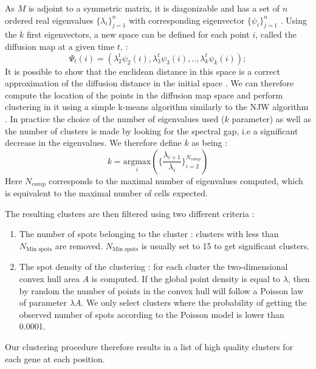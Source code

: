 \documentclass[12pt]{article}
\begin{document}
 

As $M$ is adjoint to a symmetric matrix, it is diagonizable and has a set of $n$ ordered real eigenvalues $\{\lambda_{i}\}_{j=1}^{n}$ with corresponding eigenvector $\{\psi_{i}\}_{j=1}^{n}$ . Using the $k$ first eigenvectors, a new  space can be defined for each point $i$, called the diffusion map at a given time $t$,  :
\begin{equation}
\Psi_{t}(i) = (\lambda_{2}^{t}\psi_{2}(i),\lambda_{3}^{t}\psi_{3}(i),..,\lambda_{k}^{t}\psi_{k}(i));
\end{equation}
It is possible to show that the euclidean distance in this space is a correct approximation of the diffusion distance in the initial space \citep{nadler_diffusion_2005}. We can therefore compute the location of the points in the diffusion map space and perform clustering in it using a simple k-means algorithm similarly to the NJW algorithm \citep{ng_spectral_2001,zelnik-manor_self-tuning_2004}.
In practice the choice of the number of eigenvalues used ($k$ parameter) as well as the number of clusters is made by looking for the spectral gap, i.e a significant decrease in the eigenvalues. We therefore define $k$ as being :
\begin{equation}
k = \underset{i}{ \text{argmax}}(\{\frac{\lambda_{i+1}}{\lambda_{i}}\}_{i=2}^{N_{comp}})
\end{equation}
 Here $N_{comp}$ corresponds to the maximal number of eigenvalues computed, which is equivalent to the maximal number of cells expected.
 
 The resulting clusters are then filtered using two different criteria :
 \begin{enumerate}
 \item The number of spots belonging to the cluster : clusters with less than $N_{\text{Min spots}}$ are removed. $N_{\text{Min spots}}$ is usually set to 15 to get significant clusters.
 \item The spot density of the clustering : for each cluster the two-dimensional convex hull area $A$ is computed. If the global point density is equal to $\lambda$, then by random the number of points in the convex hull will  follow a Poisson law of parameter $\lambda A$. We only select clusters where the probability of getting the observed number of spots according to the Poisson model is lower than 0.0001.
\end{enumerate}  
 
Our clustering procedure therefore results in a list of high quality clusters for each gene at each position. 
 
\end{document}
